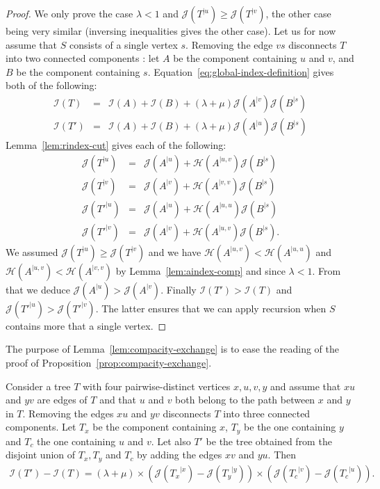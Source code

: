 \documentclass[11 pt]{modarticle}
\newcommand{\rtree}[2]{{#1}^{\lvert #2}}
\newcommand{\indexsymbol}{\mathcal{I}}
\newcommand{\tindex}[1]{\indexsymbol(#1)}
\newcommand{\rindexsymbol}{\mathcal{J}}
\newcommand{\rindex}[2]{\rindexsymbol(\rtree{#2}{#1})}
\newcommand{\aindexsymbol}{\mathcal{H}}
\newcommand{\aindex}[3]{\aindexsymbol(\rtree{#3}{#1, #2})}
\begin{document}
\begin{proof}
We only prove the case $\lambda < 1$ and $\rindex{u}{T} \geq \rindex{v}{T}$, the other case being very similar (inversing inequalities gives the other case). Let us for now assume that $S$ consists of a single vertex $s$. Removing the edge $vs$ disconnects $T$ into two connected components : let $A$ be the component containing $u$ and $v$, and $B$ be the component containing $s$. Equation~\eqref{eq:global-index-definition} gives both of the following:
\begin{eqnarray*}
	\tindex{T} & = & \tindex{A} + \tindex{B} + (\lambda + \mu) \rindex{v}{A} \rindex{s}{B} \\
	\tindex{T'} & = & \tindex{A} + \tindex{B} + (\lambda + \mu) \rindex{u}{A} \rindex{s}{B}
\end{eqnarray*}
 Lemma~\ref{lem:rindex-cut} gives each of the following:
\begin{eqnarray*}
	\rindex{u}{T} & = & \rindex{u}{A} + \aindex{u}{v}{A} \rindex{s}{B} \\
	\rindex{v}{T} & = & \rindex{v}{A} + \aindex{v}{v}{A} \rindex{s}{B} \\
	\rindex{u}{T'} & = & \rindex{u}{A} + \aindex{u}{u}{A} \rindex{s}{B} \\
	\rindex{v}{T'} & = & \rindex{v}{A} + \aindex{u}{v}{A} \rindex{s}{B}.
\end{eqnarray*}
We assumed $\rindex{u}{T} \geq \rindex{v}{T}$ and we have $\aindex{u}{v}{A} < \aindex{u}{u}{A}$ and $\aindex{u}{v}{A} < \aindex{v}{v}{A}$ by Lemma~\ref{lem:aindex-comp} and since $\lambda < 1$. From that we deduce $\rindex{u}{A} > \rindex{v}{A}$. Finally $\tindex{T'} > \tindex{T}$ and $\rindex{u}{T'} > \rindex{v}{T'}$. The latter ensures that we can apply recursion when $S$ contains more that a single vertex.
\end{proof}

The purpose of Lemma~\ref{lem:compacity-exchange} is to ease the reading of the proof of Proposition~\ref{prop:compacity-exchange}.

\begin{lem}\label{lem:compacity-exchange}
Consider a tree $T$ with four pairwise-distinct vertices $x,u,v,y$ and assume that $xu$ and $yv$ are edges of $T$ and that $u$ and $v$ both belong to the path between $x$ and $y$ in $T$. Removing the edges $xu$ and $yv$ disconnects $T$ into three connected components. Let $T_x$ be the component containing $x$, $T_y$ be the one containing $y$ and $T_c$ the one containing $u$ and $v$. Let also $T'$ be the tree obtained from the disjoint union of $T_x, T_y$ and $T_c$ by adding the edges $xv$ and $yu$. Then
\begin{eqnarray*}
	\tindex{T'} - \tindex{T} = (\lambda + \mu) \times (\rindex{x}{T_x} - \rindex{y}{T_y}) \times (\rindex{v}{T_c} - \rindex{u}{T_c}).
\end{eqnarray*}
\end{lem}
\end{document}
